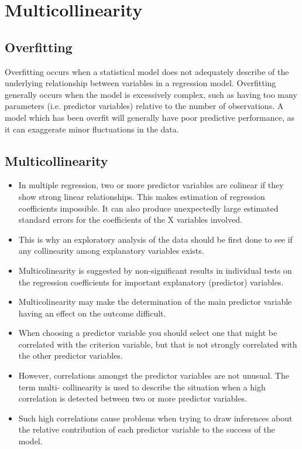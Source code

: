 \documentclass[a4paper,12pt]{article}
\begin{document}
\section*{Multicollinearity}
\subsection*{Overfitting}
Overfitting occurs when a statistical model does not adequately describe of the underlying
relationship between variables in a regression model. Overfitting generally occurs when the
model is excessively complex, such as having too many parameters (i.e. predictor variables)
relative to the number of observations. A model which has been overfit will generally have poor
predictive performance, as it can exaggerate minor fluctuations in the data.





\subsection{Multicollinearity}
\begin{itemize}
	\item In multiple regression, two or more predictor variables are colinear if they show strong
	linear relationships. This makes estimation of regression coefficients impossible. It can
	also produce unexpectedly large estimated standard errors for the coefficients of the X
	variables involved.
	\item This is why an exploratory analysis of the data should be first done to see if any collinearity
	among explanatory variables exists.
	\item Multicolinearity is suggested by non-significant results in individual tests on the regression
	coefficients for important explanatory (predictor) variables.
	\item Multicolinearity may make the determination of the main predictor variable having an
	effect on the outcome difficult.
	\item When choosing a predictor variable you should select one that might be correlated with
	the criterion variable, but that is not strongly correlated with the other predictor variables.
	\item However, correlations amongst the predictor variables are not unusual. The term multi-
	collinearity is used to describe the situation when a high correlation is detected between
	two or more predictor variables.
	\item Such high correlations cause problems when trying to draw inferences about the relative
	contribution of each predictor variable to the success of the model.
\end{itemize}
\end{document}
